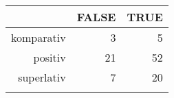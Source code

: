 \begin{tabular}{rrr}
  \lsptoprule
 & FALSE & TRUE \\ 
  \midrule
komparativ & 3 & 5 \\ 
  positiv & 21 & 52 \\ 
  superlativ & 7 & 20 \\ 
   \lspbottomrule
\end{tabular}
